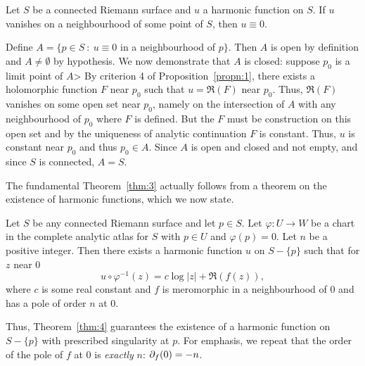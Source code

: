 \documentclass[a4paper,11pt]{article}
\begin{document}
\begin{propn}
  \label{propn:3}
  Let $S$ be a connected Riemann surface and $u$ a harmonic function
  on $S$.  If $u$ vanishes on a neighbourhood of some point of $S$,
  then $u \equiv 0$.
\end{propn}

\begin{myproof}
  Define $A = \{p \in S ~:~ u \equiv 0$ in a neighbourhood of $p\}$.
  Then $A$ is open by definition and $A \ne \emptyset$ by hypothesis.
  We now demonstrate that $A$ is closed: suppose $p_0$ is a limit
  point of $A$>  By criterion 4 of Proposition~\ref{propn:1}, there
  exists a holomorphic function $F$ near $p_0$ such that $u = \Re(F)$
  near $p_0$.  Thus, $\Re(F)$ vanishes on some open set near $p_0$,
  namely on the intersection of $A$ with any neighbourhood of $p_0$
  where $F$ is defined.  But the $F$ must be construction on this open
  set and by the uniqueness of analytic continuation $F$ is constant.
  Thus, $u$ is constant near $p_0$ and thus $p_0 \in A$.  Since $A$ is
  open and closed and not empty, and since $S$ is connected, $A = S$. 
\end{myproof}

The fundamental Theorem~\ref{thm:3} actually follows from a theorem on
the existence of harmonic functions, which we now state.
\begin{thm}
  \label{thm:4}
  Let $S$ be any connected Riemann surface and let $p \in S$.  Let
  $\varphi : U \to W$ be a chart in the complete analytic atlas for
  $S$ with $p \in U$ and $\varphi(p) = 0$.  Let $n$ be a positive
  integer.  Then there exists a harmonic function $u$ on $S-\{p\}$
  such that for $z$ near 0
  $$
  u \circ \varphi^{-1}(z) = c\log|z| + \Re(f(z)),
  $$
  where $c$ is some real constant and $f$ is meromorphic in a
  neighbourhood of 0 and has a pole of order $n$ at 0.
\end{thm}

Thus, Theorem~\ref{thm:4} guarantees the existence of a harmonic
function on $S - \{p\}$ with prescribed singularity at $p$.  For
emphasis, we repeat that the order of the pole of $f$ at 0 is
\emph{exactly} $n$: $\partial_f(0) = -n$.
\end{document}
